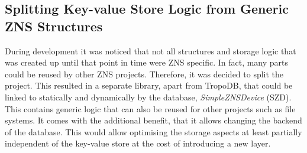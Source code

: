 \subsection{Splitting Key-value Store Logic from Generic ZNS Structures}
During development it was noticed that not all structures and storage logic that was created up until that point in time were ZNS specific. In fact, many parts could be reused by other ZNS projects. Therefore, it was decided to split the project. This resulted in a separate library, apart from TropoDB, that could be linked to statically and dynamically by the database, \textit{SimpleZNSDevice} (SZD). This contains generic logic that can also be reused for other projects such as file systems. It comes with the additional benefit, that it allows changing the backend of the database. This would allow optimising the storage aspects at least partially independent of the key-value store at the cost of introducing a new layer.


